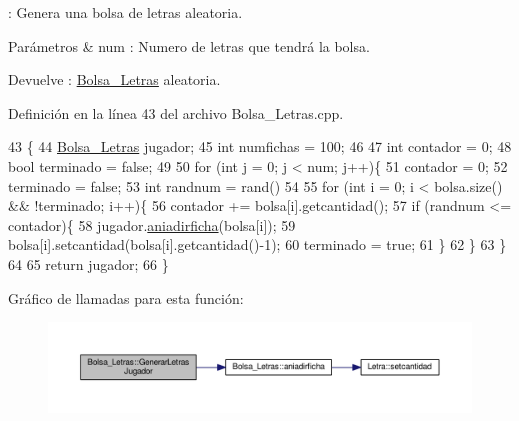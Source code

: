 \+: Genera una bolsa de letras aleatoria. 


\begin{DoxyParams}{Parámetros}
{\em } & num \+: Numero de letras que tendrá la bolsa. \\
\hline
\end{DoxyParams}
\begin{DoxyReturn}{Devuelve}
\+: \hyperlink{classBolsa__Letras}{Bolsa\+\_\+\+Letras} aleatoria. 
\end{DoxyReturn}


Definición en la línea 43 del archivo Bolsa\+\_\+\+Letras.\+cpp.


\begin{DoxyCode}
43                                                       \{
44     \hyperlink{classBolsa__Letras}{Bolsa\_Letras} jugador;
45     \textcolor{keywordtype}{int} numfichas = 100;
46 
47     \textcolor{keywordtype}{int} contador = 0;
48     \textcolor{keywordtype}{bool} terminado = \textcolor{keyword}{false};
49 
50     \textcolor{keywordflow}{for} (\textcolor{keywordtype}{int} j = 0; j < num; j++)\{
51         contador = 0;
52         terminado = \textcolor{keyword}{false};
53         \textcolor{keywordtype}{int} randnum = rand() %
54 
55         \textcolor{keywordflow}{for} (\textcolor{keywordtype}{int} i = 0; i < bolsa.size() && !terminado; i++)\{
56             contador += bolsa[i].getcantidad();
57             \textcolor{keywordflow}{if} (randnum <= contador)\{
58                 jugador.\hyperlink{classBolsa__Letras_ab058f1081bea740d77c9f9398ebd61e7}{aniadirficha}(bolsa[i]);
59                 bolsa[i].setcantidad(bolsa[i].getcantidad()-1);
60                 terminado = \textcolor{keyword}{true};
61             \}
62         \}
63     \}
64 
65     \textcolor{keywordflow}{return} jugador;
66 \}
\end{DoxyCode}


Gráfico de llamadas para esta función\+:
\nopagebreak
\begin{figure}[H]
\begin{center}
\leavevmode
\includegraphics[width=350pt]{classBolsa__Letras_a9f1e76257206146e695227576abed336_cgraph}
\end{center}
\end{figure}


